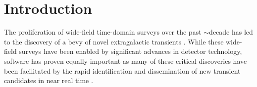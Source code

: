 \documentclass[twocolumn]{aastex63}
\begin{document}


\section{Introduction} \label{sec:intro}

The proliferation of wide-field time-domain surveys over the past $\sim$decade
has led to the discovery of a bevy of novel extragalactic transients
\citep[e.g.,][]{quimby11,Gezari12,Drout14,Gal-Yam14,Abbott17a,Prentice18,
IceCube-Collaboration18}. While these wide-field surveys have been enabled by
significant advances in detector technology, software has proven equally
important \citep[e.g.,][]{Masci17,Masci19,Smith20,Jones20} as many of these
critical discoveries have been facilitated by the rapid identification and
dissemination of new transient candidates in near real time
\citep[e.g.,][]{Patterson19}.
\end{document}
